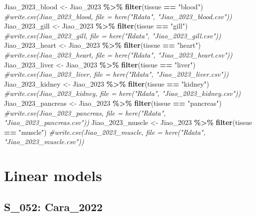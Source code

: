 \documentclass[
]{article}
\newenvironment{Shaded}{\begin{snugshade}}{\end{snugshade}}
\newcommand{\CommentTok}[1]{\textcolor[rgb]{0.56,0.35,0.01}{\textit{#1}}}
\newcommand{\FunctionTok}[1]{\textcolor[rgb]{0.13,0.29,0.53}{\textbf{#1}}}
\newcommand{\NormalTok}[1]{#1}
\newcommand{\OtherTok}[1]{\textcolor[rgb]{0.56,0.35,0.01}{#1}}
\newcommand{\SpecialCharTok}[1]{\textcolor[rgb]{0.81,0.36,0.00}{\textbf{#1}}}
\newcommand{\StringTok}[1]{\textcolor[rgb]{0.31,0.60,0.02}{#1}}
\begin{document}
\begin{Shaded}
\begin{Highlighting}[]
\NormalTok{Jiao\_2023\_blood }\OtherTok{\textless{}{-}}\NormalTok{ Jiao\_2023 }\SpecialCharTok{\%\textgreater{}\%} 
  \FunctionTok{filter}\NormalTok{(tissue }\SpecialCharTok{==} \StringTok{"blood"}\NormalTok{)}
\CommentTok{\#write.csv(Jiao\_2023\_blood, file = here("Rdata", "Jiao\_2023\_blood.csv"))}
\NormalTok{Jiao\_2023\_gill }\OtherTok{\textless{}{-}}\NormalTok{ Jiao\_2023 }\SpecialCharTok{\%\textgreater{}\%} 
  \FunctionTok{filter}\NormalTok{(tissue }\SpecialCharTok{==} \StringTok{"gill"}\NormalTok{)}
\CommentTok{\#write.csv(Jiao\_2023\_gill, file = here("Rdata", "Jiao\_2023\_gill.csv"))}
\NormalTok{Jiao\_2023\_heart }\OtherTok{\textless{}{-}}\NormalTok{ Jiao\_2023 }\SpecialCharTok{\%\textgreater{}\%} 
  \FunctionTok{filter}\NormalTok{(tissue }\SpecialCharTok{==} \StringTok{"heart"}\NormalTok{)}
\CommentTok{\#write.csv(Jiao\_2023\_heart, file = here("Rdata", "Jiao\_2023\_heart.csv"))}
\NormalTok{Jiao\_2023\_liver }\OtherTok{\textless{}{-}}\NormalTok{ Jiao\_2023 }\SpecialCharTok{\%\textgreater{}\%} 
  \FunctionTok{filter}\NormalTok{(tissue }\SpecialCharTok{==} \StringTok{"liver"}\NormalTok{)}
\CommentTok{\#write.csv(Jiao\_2023\_liver, file = here("Rdata", "Jiao\_2023\_liver.csv"))}
\NormalTok{Jiao\_2023\_kidney }\OtherTok{\textless{}{-}}\NormalTok{ Jiao\_2023 }\SpecialCharTok{\%\textgreater{}\%} 
  \FunctionTok{filter}\NormalTok{(tissue }\SpecialCharTok{==} \StringTok{"kidney"}\NormalTok{)}
\CommentTok{\#write.csv(Jiao\_2023\_kidney, file = here("Rdata", "Jiao\_2023\_kidney.csv"))}
\NormalTok{Jiao\_2023\_pancreas }\OtherTok{\textless{}{-}}\NormalTok{ Jiao\_2023 }\SpecialCharTok{\%\textgreater{}\%} 
  \FunctionTok{filter}\NormalTok{(tissue }\SpecialCharTok{==} \StringTok{"pancreas"}\NormalTok{)}
\CommentTok{\#write.csv(Jiao\_2023\_pancreas, file = here("Rdata", "Jiao\_2023\_pancreas.csv"))}
\NormalTok{Jiao\_2023\_muscle }\OtherTok{\textless{}{-}}\NormalTok{ Jiao\_2023 }\SpecialCharTok{\%\textgreater{}\%} 
  \FunctionTok{filter}\NormalTok{(tissue }\SpecialCharTok{==} \StringTok{"muscle"}\NormalTok{)}
\CommentTok{\#write.csv(Jiao\_2023\_muscle, file = here("Rdata", "Jiao\_2023\_muscle.csv"))}
\end{Highlighting}
\end{Shaded}

\section{Linear models}\label{linear-models}

\subsection{S\_052: Cara\_2022}\label{s_052-cara_2022-1}
\end{document}
